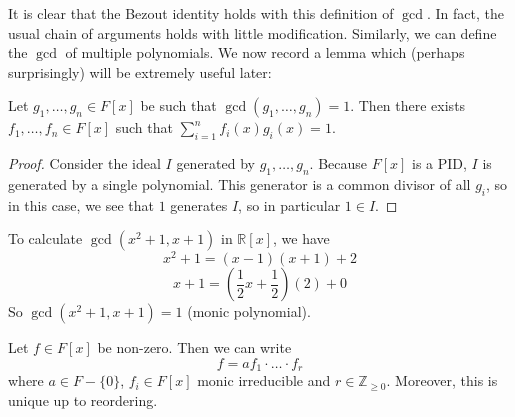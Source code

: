 \documentclass{scrartcl}
\def\ge{\geqslant}
\def\Z{\mathbb{Z}}
\def\R{\mathbb{R}}
\begin{document}
It is clear that the Bezout identity holds with this definition of $\gcd$. In fact, the usual chain of arguments holds with little modification. Similarly, we can define the $\gcd$ of multiple polynomials. We now record a lemma which (perhaps surprisingly) will be extremely useful later:
\begin{lemma} \label{bezout}
	Let $g_1, \dots, g_n \in F[x]$ be such that $\gcd(g_1, \dots, g_n)=1$. Then there exists $f_1, \dots, f_n \in F[x]$ such that $\sum_{i=1}^{n}f_i(x)g_i(x) = 1$.
\end{lemma}
\begin{proof}
	Consider the ideal $I$ generated by $g_1, \dots, g_n$. Because $F[x]$ is a PID, $I$ is generated by a single polynomial. This generator is a common divisor of all $g_i$, so in this case, we see that $1$ generates $I$, so in particular $1 \in I$. 
\end{proof}
\begin{example}
	To calculate $\gcd(x^2+1, x+1)$ in $\R[x]$, we have
	\[x^2+1 = (x-1)(x+1)+2\]
	\[x+1 = \left(\frac{1}{2}x+\frac{1}{2}\right)(2) + 0\]
	So $\gcd(x^2+1, x+1)=1$ (monic polynomial). 
\end{example}
\begin{theorem}
	Let $f \in F[x]$ be non-zero. Then we can write
	\[f = af_1\cdot \dots \cdot f_r\]
	where $a \in F - \{0\}$, $f_i \in F[x]$ monic irreducible and $r \in \Z_{\ge 0}$. Moreover, this is unique up to reordering. 
\end{theorem}
\end{document}
